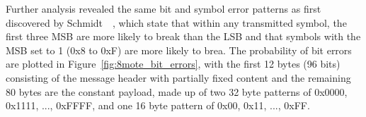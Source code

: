 Further analysis revealed the same bit and symbol error patterns as first discovered by Schmidt~\etal~\cite{Schmidt2013}, which state that within any transmitted symbol, the first three MSB are more likely to break than the LSB and that symbols with the MSB set to 1 (\ie 0x8 to 0xF) are more likely to brea.
The probability of bit errors are plotted in Figure~\ref{fig:8mote_bit_errors}, with the first 12 bytes (96 bits) consisting of the message header with partially fixed content and the remaining 80 bytes are the constant payload, made up of two 32 byte patterns of 0x0000, 0x1111, ..., 0xFFFF, and one 16 byte pattern of 0x00, 0x11, ..., 0xFF.

\begin{figure}[H]
\end{figure}
